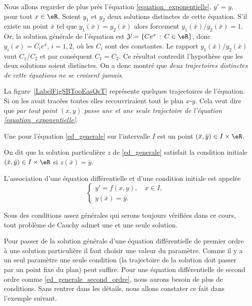 \begin{example}
  Nous allons regarder de plus près l'équation \eqref{equation_exponentielle}, $y'=y$, pour tout $x\in\eR$. Soient $y_1$ et $y_2$ deux solutions distinctes de cette équation. S'il existe un point $\bar x$ tel que $y_1(\bar x) = y_2 (\bar x)$ alors forcement $y_1(\bar x)/y_2 (\bar x)=1$. Or, la solution générale de l'équation est \(\mathcal{Y} = \{Ce^x\, : \, C\in\eR\}\), donc $y_i(x) = C_ie^x$, $i= 1,2$, o\`u les $C_i$ sont des constantes. Le rapport $y_1(\bar x)/y_2 (\bar x)$ vaut $C_1/C_2$ et par conséquent $C_1 = C_2$. Ce résultat contredit l'hypothèse que les deux solutions soient distinctes. On a donc montré que \emph{deux trajectoires distinctes de cette équations ne se croisent jamais}.

\newcommand{\CaptionFigSBTooEasQsT}{Quelques trajectoires de l'équation \( y'=y\).}


La figure~\ref{LabelFigSBTooEasQsT} représente quelques trajectoires de l'équation. Si on les avait tracées toutes elles recouvriraient tout le plan $x$-$y$. Cela veut dire que \emph{par tout point $(x,y)$ passe une et une seule trajectoire de l'équation \eqref{equation_exponentielle}}.

\end{example}
\begin{definition}
  Une  pour l'équation \eqref{ed_generale} sur l'intervalle \(I\) est un point \((\bar x, \bar y)\in I\times\eR\).

On dit que la solution particulière \(z\) de \eqref{ed_generale} satisfait la condition initiale \((\bar x, \bar y)\in I\times\eR\) si \(z(\bar x) =\bar y\).
\end{definition}
\begin{definition}
  L'association d'une équation différentielle et d'une condition initiale est appelée 
  \begin{equation}\label{plme_cauchy}
    \begin{cases}
      y'= f(x,y), \quad x\in I, \\
      y(\bar x) = \bar y.
    \end{cases}
  \end{equation}
\end{definition}
\begin{remark}
  Sous des conditions assez générales qui serons toujours vérifiées dans ce cours, tout problème de Cauchy admet une et une seule solution.
\end{remark}
Pour passer de la solution générale d'une équation différentielle de premier ordre \`a une solution particulière il faut choisir une valeur du paramètre. Comme il y a un seul paramètre une seule condition (la trajectoire de la solution doit passer par un point fixe du plan) peut suffire. Pour une équation différentielle de second ordre comme \eqref{ed_generale_second_ordre}, nous aurons besoin de plus de conditions. Sans rentrer dans les détails, nous allons constater ce fait dans l'exemple suivant.

